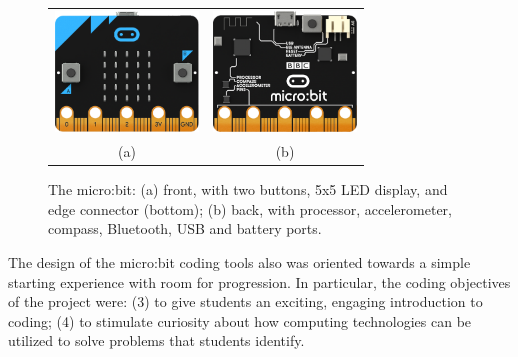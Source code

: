 \begin{figure} 
\begin{tabular}{cc}
  \includegraphics[width=1.5in]{images/microbit-front.png} &
  \includegraphics[width=1.5in]{images/microbit-back.png} \\
  (a) & (b) 
\end{tabular}
\caption{\label{fig:microbit}The micro:bit: (a) front, with two buttons, 
  5x5 LED display, and edge connector (bottom); (b) back, with processor, accelerometer, compass, Bluetooth, USB and battery ports.}
\end{figure}


The design of the micro:bit coding tools also was oriented towards a 
simple starting experience with room for progression. In particular, the coding 
objectives of the project were: (3)
to give students an exciting, engaging introduction to coding;
(4) to stimulate curiosity about how computing technologies can be utilized 
  to solve problems that students identify. 

